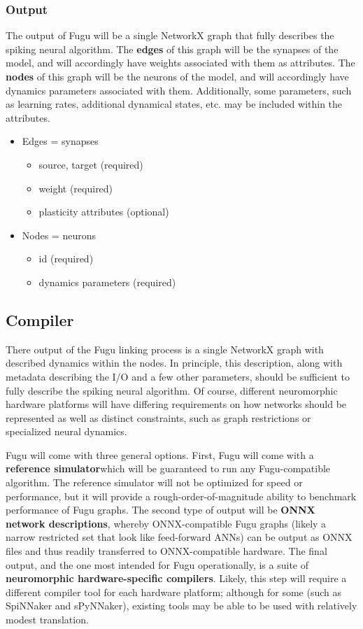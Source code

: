 \documentclass{article}
\begin{document}
\subsubsection{Output}
The output of Fugu will be a single NetworkX graph that fully describes the spiking neural algorithm.  The \textbf{edges} of this graph will be the synapses of the model, and will accordingly have weights associated with them as attributes.  The \textbf{nodes} of this graph will be the neurons of the model, and will accordingly have dynamics parameters associated with them.  Additionally, some parameters, such as learning rates, additional dynamical states, etc. may be included within the attributes.

\begin{itemize}
	\item Edges = synapses
	\begin{itemize}
		\item source, target (required)
		\item weight (required)
		\item plasticity attributes (optional)
	\end{itemize}
	\item Nodes = neurons
	\begin{itemize}
		\item id (required)
		\item dynamics parameters (required)
	\end{itemize}
		
\end{itemize}


\subsection{Compiler}

There output of the Fugu linking process is a single NetworkX graph with described dynamics within the nodes.  In principle, this description, along with metadata describing the I/O and a few other parameters, should be sufficient to fully describe the spiking neural algorithm.  Of course, different neuromorphic hardware platforms will have differing requirements on how networks should be represented as well as distinct constraints, such as graph restrictions or specialized neural dynamics.  

Fugu will come with three general options.  First, Fugu will come with a \textbf{reference simulator}which will be guaranteed to run any Fugu-compatible algorithm.  The reference simulator will not be optimized for speed or performance, but it will provide a rough-order-of-magnitude ability to benchmark performance of Fugu graphs.  The second type of output will be \textbf{ONNX network descriptions}, whereby ONNX-compatible Fugu graphs (likely a narrow restricted set that look like feed-forward ANNs) can be output as ONNX files and thus readily transferred to ONNX-compatible hardware.  The final output, and the one most intended for Fugu operationally, is a suite of \textbf{neuromorphic hardware-specific compilers}.  Likely, this step will require a different compiler tool for each hardware platform; although for some (such as SpiNNaker and sPyNNaker), existing tools may be able to be used with relatively modest translation.
\end{document}

